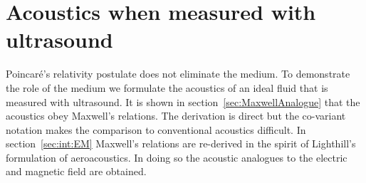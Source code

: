 \documentclass[10pt, fleqn,final,showtrims,oldfontcommands, article,a4paper,oneside]{memoir} %
\newcommand{\secref}[1]{section~\ref{sec:#1}}
\newcommand{\Poincare}{Poincar{\'e}}
\begin{document}







\section{Acoustics when measured with ultrasound}\label{sec:Maxwell}

\Poincare's relativity postulate does not eliminate the medium.
To demonstrate the role of the medium we formulate the acoustics of  an ideal fluid that is measured with ultrasound.
It is shown in \secref{MaxwellAnalogue} that the acoustics  obey Maxwell's relations.
The derivation is direct but the co-variant notation makes the comparison to conventional acoustics difficult.
In \secref{int:EM} Maxwell's relations are re-derived in the spirit of Lighthill's formulation of aeroacoustics.
In doing so the acoustic analogues to the electric and magnetic field are obtained.
\end{document}
